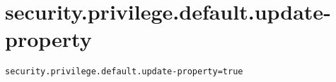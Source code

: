 \section{security.privilege.default.update-property}
\label{configuration:SecurityPrivilegeDefaultUpdateProperty}
\ClearAPI
\TODO
{}
\begin{lstlisting}[style=Props,caption={Usage example for \textit{security.privilege.default.update-property}}]
security.privilege.default.update-property=true
\end{lstlisting}